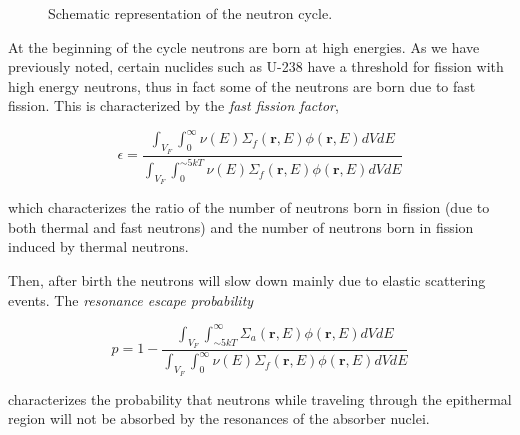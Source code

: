 \begin{figure}[ht!]
\protect {}\protect
\caption{\label{fig:neutroncycle} \footnotesize{Schematic representation of the neutron cycle.}}
\end{figure}

At the beginning of the cycle neutrons are born at high energies. As we have previously noted, certain nuclides such as U-238 have a threshold for fission with high energy neutrons, thus in fact some of the neutrons are born due to fast fission. This is characterized by the \textit{fast fission factor}, 

$$\epsilon=\frac{\int_{V_{F}} \int_0^\infty \nu(E)\Sigma_f(\mathbf{r},E)\phi(\mathbf{r},E)dVdE}{\int_{V_{F}} \int_0^{\sim 5kT} \nu(E)\Sigma_f(\mathbf{r},E)\phi(\mathbf{r},E)dVdE}$$

\noindent which characterizes the ratio of the number of neutrons born in fission (due to both thermal and fast neutrons) and the number of neutrons born in fission induced by thermal neutrons.

Then, after birth the neutrons will slow down mainly due to elastic scattering events. The \textit{resonance escape probability} 

$$p=1-\frac{\int_{V_{F}} \int_{\sim 5kT}^\infty \Sigma_a(\mathbf{r},E)\phi(\mathbf{r},E)dVdE}{\int_{V_{F}} \int_0^{\infty} \nu(E)\Sigma_f(\mathbf{r},E)\phi(\mathbf{r},E)dVdE}$$

\noindent characterizes the probability that neutrons while traveling through the epithermal region will not be absorbed by the resonances of the absorber nuclei. 

